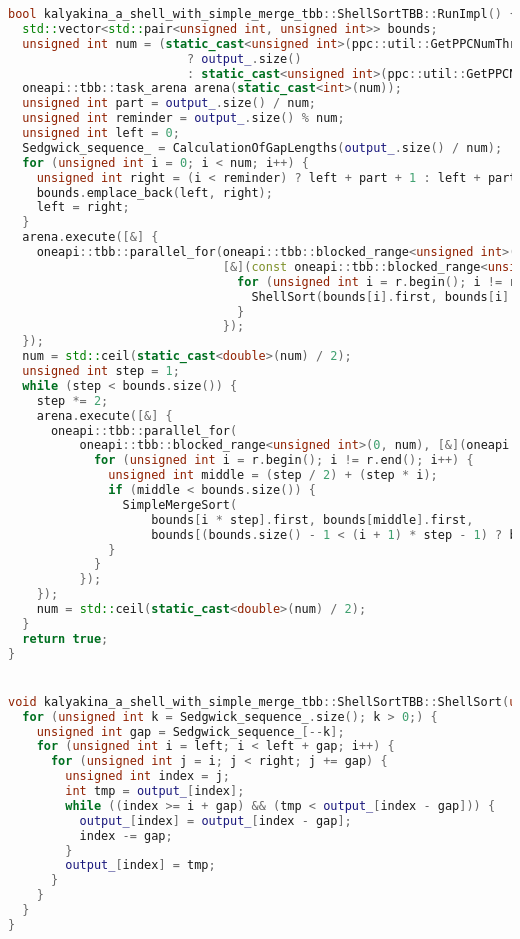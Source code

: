 \documentclass[a4paper,14pt]{extarticle}
\begin{document}
\begin{lstlisting}[language=C++]
bool kalyakina_a_shell_with_simple_merge_tbb::ShellSortTBB::RunImpl() {
  std::vector<std::pair<unsigned int, unsigned int>> bounds;
  unsigned int num = (static_cast<unsigned int>(ppc::util::GetPPCNumThreads()) > output_.size())
                         ? output_.size()
                         : static_cast<unsigned int>(ppc::util::GetPPCNumThreads());
  oneapi::tbb::task_arena arena(static_cast<int>(num));
  unsigned int part = output_.size() / num;
  unsigned int reminder = output_.size() % num;
  unsigned int left = 0;
  Sedgwick_sequence_ = CalculationOfGapLengths(output_.size() / num);
  for (unsigned int i = 0; i < num; i++) {
    unsigned int right = (i < reminder) ? left + part + 1 : left + part;
    bounds.emplace_back(left, right);
    left = right;
  }
  arena.execute([&] {
    oneapi::tbb::parallel_for(oneapi::tbb::blocked_range<unsigned int>(0, num),
                              [&](const oneapi::tbb::blocked_range<unsigned int> &r) {
                                for (unsigned int i = r.begin(); i != r.end(); i++) {
                                  ShellSort(bounds[i].first, bounds[i].second);
                                }
                              });
  });
  num = std::ceil(static_cast<double>(num) / 2);
  unsigned int step = 1;
  while (step < bounds.size()) {
    step *= 2;
    arena.execute([&] {
      oneapi::tbb::parallel_for(
          oneapi::tbb::blocked_range<unsigned int>(0, num), [&](oneapi::tbb::blocked_range<unsigned int> &r) {
            for (unsigned int i = r.begin(); i != r.end(); i++) {
              unsigned int middle = (step / 2) + (step * i);
              if (middle < bounds.size()) {
                SimpleMergeSort(
                    bounds[i * step].first, bounds[middle].first,
                    bounds[(bounds.size() - 1 < (i + 1) * step - 1) ? bounds.size() - 1 : ((i + 1) * step) - 1].second);
              }
            }
          });
    });
    num = std::ceil(static_cast<double>(num) / 2);
  }
  return true;
}


void kalyakina_a_shell_with_simple_merge_tbb::ShellSortTBB::ShellSort(unsigned int left, unsigned int right) {
  for (unsigned int k = Sedgwick_sequence_.size(); k > 0;) {
    unsigned int gap = Sedgwick_sequence_[--k];
    for (unsigned int i = left; i < left + gap; i++) {
      for (unsigned int j = i; j < right; j += gap) {
        unsigned int index = j;
        int tmp = output_[index];
        while ((index >= i + gap) && (tmp < output_[index - gap])) {
          output_[index] = output_[index - gap];
          index -= gap;
        }
        output_[index] = tmp;
      }
    }
  }
}
\end{lstlisting}
\end{document}
